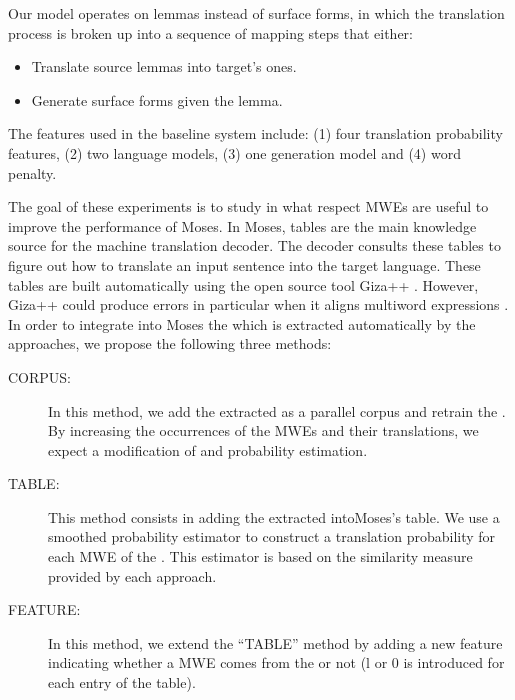 \documentclass[output=paper,modfonts,nonflat]{langsci/langscibook}
\begin{document}
Our model operates on lemmas instead of surface forms, in which the translation process is broken up into a sequence of mapping steps that either:
\begin{itemize}
\item Translate source lemmas into target's ones.
\item Generate surface forms given the lemma.
\end{itemize}


The features used in the baseline system include: (1) four translation probability features, (2) two language models, (3) one generation model and (4) word penalty. %

The goal of these experiments is to study in what respect MWEs are useful to improve the performance of Moses. In Moses,  tables are the main knowledge source for the machine translation decoder. The decoder consults these tables to figure out how to translate an input sentence into the target language. These tables are built automatically using the open source  tool Giza++ \citep{och2000improved}. However, Giza++ could produce errors in particular when it aligns multiword expressions \citep{fraser2007measuring}. In order to integrate into Moses the  which is extracted automatically by the  approaches, we propose the following three methods:
\begin{description}
\item[CORPUS:] In this method, we add the extracted  as a parallel corpus and retrain the . By increasing the occurrences of the MWEs and their translations, we expect a modification of  and probability estimation.
 \item[TABLE:] This method consists in adding the extracted  into\linebreak Moses’s  table. We use a smoothed probability estimator to construct a translation probability for each MWE of the . This estimator is based on the similarity measure provided by each  approach.
 \item[FEATURE:] In this method, we extend the ``TABLE'' method by adding a new feature indicating whether a MWE comes from the  or not (l or 0 is introduced for each entry of the  table).
\end{description}
\end{document}
